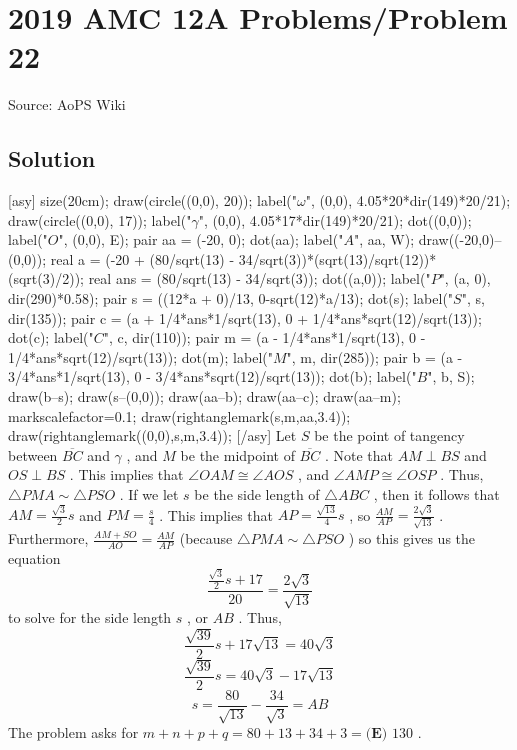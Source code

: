 \documentclass[12pt]{article}
\begin{document}
\section*{{2019 AMC 12A Problems/Problem 22}}
Source: AoPS Wiki

\subsection*{Solution}
[asy] size(20cm); draw(circle((0,0), 20)); label("$\omega$", (0,0), 4.05*20*dir(149)*20/21); draw(circle((0,0), 17)); label("$\gamma$", (0,0), 4.05*17*dir(149)*20/21); dot((0,0)); label("$O$", (0,0), E); pair aa = (-20, 0); dot(aa); label("$A$", aa, W); draw((-20,0)--(0,0)); real a = (-20 + (80/sqrt(13) - 34/sqrt(3))*(sqrt(13)/sqrt(12))*(sqrt(3)/2)); real ans = (80/sqrt(13) - 34/sqrt(3)); dot((a,0)); label("$P$", (a, 0), dir(290)*0.58); pair s = ((12*a + 0)/13, 0-sqrt(12)*a/13); dot(s); label("$S$", s, dir(135)); pair c = (a + 1/4*ans*1/sqrt(13), 0 + 1/4*ans*sqrt(12)/sqrt(13)); dot(c); label("$C$", c, dir(110)); pair m = (a - 1/4*ans*1/sqrt(13), 0 - 1/4*ans*sqrt(12)/sqrt(13)); dot(m); label("$M$", m, dir(285)); pair b = (a - 3/4*ans*1/sqrt(13), 0 - 3/4*ans*sqrt(12)/sqrt(13)); dot(b); label("$B$", b, S); draw(b--s); draw(s--(0,0)); draw(aa--b); draw(aa--c); draw(aa--m); markscalefactor=0.1; draw(rightanglemark(s,m,aa,3.4)); draw(rightanglemark((0,0),s,m,3.4)); [/asy] Let $S$ be the point of tangency between $\overline{BC}$ and $\gamma$ , and $M$ be the midpoint of $\overline{BC}$ . Note that $AM \perp BS$ and $OS \perp BS$ . This implies that $\angle OAM \cong \angle AOS$ , and $\angle AMP \cong \angle OSP$ . Thus, $\triangle PMA \sim \triangle PSO$ . If we let $s$ be the side length of $\triangle ABC$ , then it follows that $AM = \frac{\sqrt{3}}{2}s$ and $PM = \frac{s}{4}$ . This implies that $AP = \frac{\sqrt{13}}{4}s$ , so $\frac{AM}{AP} = \frac{2\sqrt{3}}{\sqrt{13}}$ . Furthermore, $\frac{AM + SO}{AO} = \frac{AM}{AP}$ (because $\triangle PMA \sim \triangle PSO$ ) so this gives us the equation \[\frac{\frac{\sqrt{3}}{2}s + 17}{20} = \frac{2\sqrt{3}}{\sqrt{13}}\] to solve for the side length $s$ , or $AB$ . Thus, \[\frac{\sqrt{39}}{2}s + 17\sqrt{13} = 40\sqrt{3}\] \[\frac{\sqrt{39}}{2}s = 40\sqrt{3} - 17\sqrt{13}\] \[s = \frac{80}{\sqrt{13}} - \frac{34}{\sqrt{3}} = AB\] The problem asks for $m + n + p + q = 80 + 13 + 34 + 3 = \boxed{\textbf{(E) } 130}$ .
\end{document}
